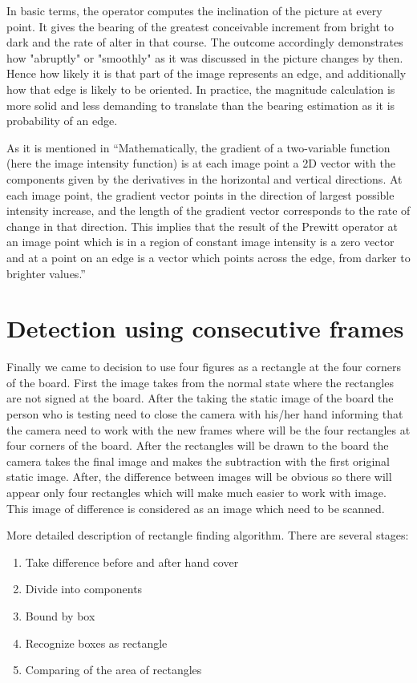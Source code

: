 In basic terms, the operator computes the inclination of the picture at every point. It gives the bearing of the greatest conceivable increment from bright to dark and the rate of alter in that course. The outcome accordingly demonstrates how "abruptly" or "smoothly" as it was discussed in \cite{Roberts} the picture changes by then. Hence how likely it is that part of the image represents an edge, and additionally how that edge is likely to be oriented. In practice, the magnitude calculation is more solid and less demanding to translate than the bearing estimation as it is probability of an edge.

As it is mentioned in \cite{Raman} ``Mathematically, the gradient of a two-variable function (here the image intensity function) is at each image point a 2D vector with the components given by the derivatives in the horizontal and vertical directions. At each image point, the gradient vector points in the direction of largest possible intensity increase, and the length of the gradient vector corresponds to the rate of change in that direction. This implies that the result of the Prewitt operator at an image point which is in a region of constant image intensity is a zero vector and at a point on an edge is a vector which points across the edge, from darker to brighter values.''

\section{Detection using consecutive frames}

Finally we came to decision to use four figures as a rectangle at the four corners of the board. First the image takes from the normal state where the rectangles are not signed at the board. After the taking the static image of the board the person who is testing need to close the camera with his/her hand informing that the camera need to work with the new frames where will be the four rectangles at four corners of the board. After the rectangles will be drawn to the board the camera takes the final image and makes the subtraction with the first original static image. After, the difference between images will be obvious so there will appear only four rectangles which will make much easier to work with image. This image of difference is considered as an image which need to be scanned. 

More detailed description of rectangle finding algorithm. There are several stages:
\begin{enumerate}
\item Take difference before and after hand cover
\item Divide into components
\item Bound by box
\item Recognize boxes as rectangle
\item Comparing of the area of rectangles
\end{enumerate}

